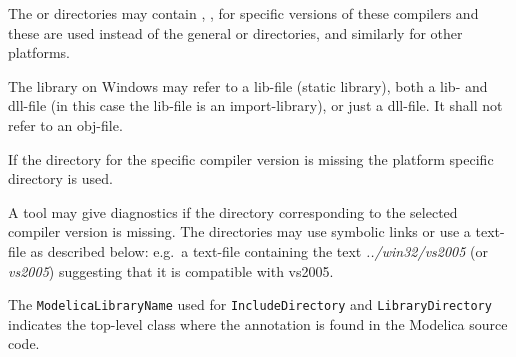 The  or  directories may contain , , 
for specific versions of these compilers and these are used instead of
the general  or  directories, and similarly for other
platforms.

The library on Windows may refer to a lib-file (static library), both a lib- and dll-file (in this case the lib-file is an import-library),
or just a dll-file. It shall not refer to an obj-file.

If the directory for the specific compiler version is missing the
platform specific directory is used.

\begin{nonnormative}
A tool may give diagnostics if the directory corresponding to the selected compiler version is missing.  The directories may use symbolic links or use
a text-file as described below: e.g.\ a text-file  containing the text \emph{../win32/vs2005} (or \emph{vs2005}) suggesting that it is
compatible with vs2005.
\end{nonnormative}

The \lstinline!ModelicaLibraryName! used for \lstinline!IncludeDirectory! and \lstinline!LibraryDirectory! indicates the top-level class where the annotation is found in the Modelica source code.


